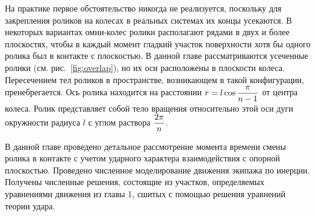 На практике первое обстоятельство никогда не реализуется, поскольку для закрепления роликов на колесах в реальных системах их концы усекаются. В некоторых вариантах омни-колес ролики располагают рядами в двух и более плоскостях, чтобы в каждый момент гладкий участок поверхности хотя бы одного ролика был в контакте с плоскостью. В данной главе рассматриваются усеченные ролики (см. рис.~\ref{fig:overlap}), но их оси расположены в плоскости колеса. Пересечением тел роликов в пространстве, возникающем в такой конфигурации, пренебрегается. Ось ролика находится на расстоянии $r = l\cos\displaystyle\frac{\displaystyle \pi}{\displaystyle n-1}$ от центра колеса. Ролик представляет собой тело вращения относительно этой оси дуги окружности радиуса $l$ с углом раствора $\displaystyle\frac{\displaystyle 2\pi}{\displaystyle n}$.

В данной главе проведено детальное рассмотрение момента времени смены ролика в контакте с учетом ударного характера взаимодействия с опорной плоскостью. Проведено численное моделирование движения экипажа по инерции. Получены численные решения, состоящие из участков, определяемых уравнениями движения из главы 1, сшитых с помощью решения уравнений теории удара.
